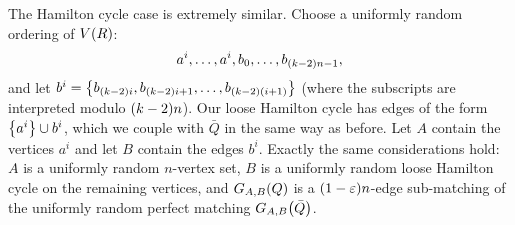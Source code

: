 \documentclass[11pt,english]{article}
\theoremstyle{plain}
\theoremstyle{definition}
\theoremstyle{definition}
\theoremstyle{plain}
\theoremstyle{plain}
\theoremstyle{plain}
\theoremstyle{plain}
\theoremstyle{remark}
\theoremstyle{remark}
\let\originalleft\left
\let\originalright\right
\renewcommand{\left}{\mathopen{}\mathclose\bgroup\originalleft}
\renewcommand{\right}{\aftergroup\egroup\originalright}
\begin{document}
The Hamilton cycle case is extremely similar. Choose a uniformly random
ordering of $V\left(R\right)$:
\[
a^{i},\dots,a^{i},b_{0},\dots,b_{\left(k-2\right)n-1},
\]
and let $b^{i}=\left\{ b_{\left(k-2\right)i},b_{\left(k-2\right)i+1},\dots,b_{\left(k-2\right)\left(i+1\right)}\right\} $
(where the subscripts are interpreted modulo $\left(k-2\right)n$).
Our loose Hamilton cycle has edges of the form $\left\{ a^{i}\right\} \cup b^{i}$,
which we couple with $\bar{Q}$ in the same way as before. Let $A$ contain
the vertices $a^{i}$ and let $B$ contain the
edges $b^{i}$. Exactly the same considerations hold: $A$ is a uniformly
random $n$-vertex set, $B$ is a uniformly random loose Hamilton
cycle on the remaining vertices, and $G_{A,B}\left(Q\right)$ is a
$\left(1-\varepsilon\right)n$-edge sub-matching of the uniformly random perfect
matching $G_{A,B}\left(\bar{Q}\right)$.
\end{document}
